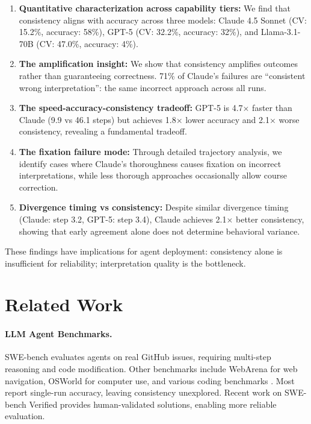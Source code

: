 \documentclass{article}
\begin{document}
\begin{enumerate}
    \item \textbf{Quantitative characterization across capability tiers:} We find that consistency aligns with accuracy across three models: Claude 4.5 Sonnet (CV: 15.2\%, accuracy: 58\%), GPT-5 (CV: 32.2\%, accuracy: 32\%), and Llama-3.1-70B (CV: 47.0\%, accuracy: 4\%).
    
    \item \textbf{The amplification insight:} We show that consistency amplifies outcomes rather than guaranteeing correctness. 71\% of Claude's failures are ``consistent wrong interpretation'': the same incorrect approach across all runs.
    
    \item \textbf{The speed-accuracy-consistency tradeoff:} GPT-5 is 4.7$\times$ faster than Claude (9.9 vs 46.1 steps) but achieves 1.8$\times$ lower accuracy and 2.1$\times$ worse consistency, revealing a fundamental tradeoff.
    
    \item \textbf{The fixation failure mode:} Through detailed trajectory analysis, we identify cases where Claude's thoroughness causes fixation on incorrect interpretations, while less thorough approaches occasionally allow course correction.
    
    \item \textbf{Divergence timing vs consistency:} Despite similar divergence timing (Claude: step 3.2, GPT-5: step 3.4), Claude achieves 2.1$\times$ better consistency, showing that early agreement alone does not determine behavioral variance.
\end{enumerate}

These findings have implications for agent deployment: consistency alone is insufficient for reliability; interpretation quality is the bottleneck.

\section{Related Work}
\label{sec:related}

\paragraph{LLM Agent Benchmarks.} SWE-bench \citep{swebench} evaluates agents on real GitHub issues, requiring multi-step reasoning and code modification. Other benchmarks include WebArena \citep{webarena} for web navigation, OSWorld \citep{osworld} for computer use, and various coding benchmarks \citep{humaneval, mbpp}. Most report single-run accuracy, leaving consistency unexplored. Recent work on SWE-bench Verified \citep{swebench_verified} provides human-validated solutions, enabling more reliable evaluation.
\end{document}
